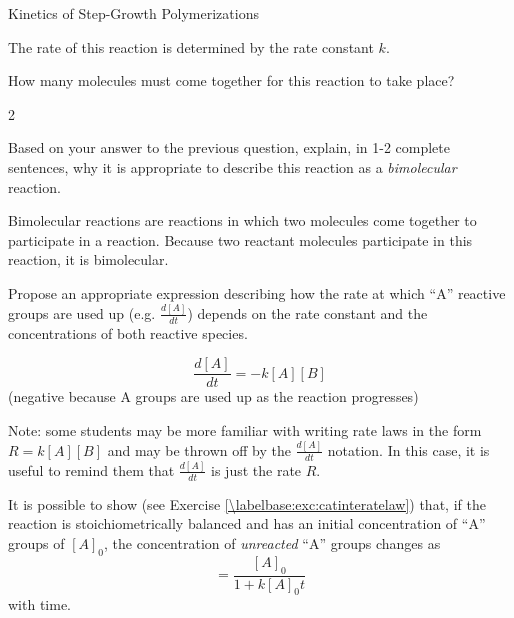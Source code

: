 \begin{activity}{Kinetics of Step-Growth Polymerizations}
\begin{model}
	The rate of this reaction is determined by the rate constant $k$.

\end{model}


\begin{ctqs}

	\question How many molecules must come together for this reaction to take place?
	
		\begin{solution}[0.5in]
			2
		\end{solution}
	
	\question Based on your answer to the previous question, explain, in 1-2 complete sentences, why it is appropriate to describe this reaction as a \emph{bimolecular} reaction.
	
		\begin{solution}[1in]
			Bimolecular reactions are reactions in which two molecules come together to participate in a reaction.  Because two reactant molecules participate in this reaction, it is bimolecular.
		\end{solution}
	
	\question Propose an appropriate expression describing how the rate at which ``A'' reactive groups are used up (e.g. $\frac{d[A]}{dt}$) depends on the rate constant and the concentrations of both reactive species.
		\label{\labelbase:ctq:proposeratelaw}
		
		\begin{solution}[1in]
			\begin{equation*}
				\frac{d[A]}{dt} = -k[A][B]
			\end{equation*}
			(negative because A groups are used up as the reaction progresses)
			
			Note: some students may be more familiar with writing rate laws in the form $R = k[A][B]$ and may be thrown off by the $\frac{d[A]}{dt}$ notation.  In this case, it is useful to remind them that $\frac{d[A]}{dt}$ is just the rate $R$.
			
		\end{solution}
		
\end{ctqs}

\begin{infobox}
	It is possible to show (see Exercise \ref{\labelbase:exc:catinteratelaw}) that, if the reaction is stoichiometrically balanced and has an initial concentration of ``A'' groups of $[A]_0$, the concentration of \emph{unreacted} ``A'' groups changes as
	\begin{equation*}
		[A] = \frac{[A]_0}{1 + k[A]_0 t}
	\end{equation*}	
	with time.
	\label{\labelbase:infobox:catintegrated}
\end{infobox}


\end{activity}

